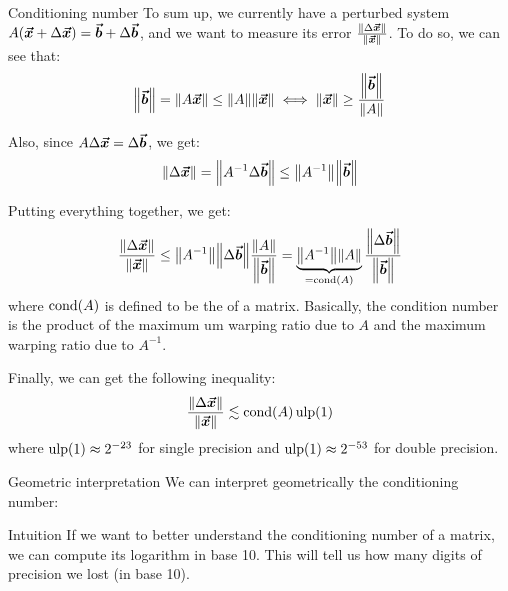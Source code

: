 \documentclass[a4paper]{article}
\begin{document}
\begin{parag}{Conditioning number}
    To sum up, we currently have a perturbed system $A\left(\bvec{x} + \Delta \bvec{x}\right) = \bvec{b} + \Delta \bvec{b}$, and we want to measure its error $\frac{\left\|\Delta \bvec{x}\right\|}{\left\|\bvec{x}\right\|}$. To do so, we can see that: 
    \[\left\|\bvec{b}\right\| = \left\|A \bvec{x}\right\| \leq \left\|A\right\| \left\|\bvec{x}\right\| \iff \left\|\bvec{x}\right\| \geq \frac{\left\|\bvec{b}\right\|}{\left\|A\right\|}\]
    
    Also, since $A \Delta \bm{\protect\vec{x}} = \Delta \bm{\protect\vec{b}}$, we get: 
    \[\left\|\Delta \bvec{x}\right\| = \left\|A ^{-1} \Delta \bvec{b}\right\| \leq \left\|A^{-1}\right\| \left\|\bvec{b}\right\|\]
    
    Putting everything together, we get: 
    \[\frac{\left\|\Delta \bvec{x}\right\|}{\left\|\bvec{x}\right\|} \leq \left\|A^{-1}\right\|\left\|\Delta \bvec{b}\right\| \frac{\left\|A\right\|}{\left\|\bvec{b}\right\|} = \underbrace{\left\|A^{-1}\right\| \left\|A\right\|}_{= \cond\left(A\right)} \frac{\left\|\Delta \bvec{b}\right\|}{\left\|\bvec{b}\right\|}\]
    where $\cond\left(A\right)$ is defined to be the  of a matrix. Basically, the condition number is the product of the maximum um warping ratio due to $A$ and the maximum warping ratio due to $A^{-1}$.
        
    Finally, we can get the following inequality: 
    \[\frac{\left\|\Delta\bvec{x}\right\|}{\left\| \bvec{x}\right\|} \lesssim \cond\left(A\right) \ulp\left(1\right)\]
    where $\ulp\left(1\right) \approx 2^{-23}$ for single precision and $\ulp\left(1\right) \approx 2^{-53}$ for double precision.

    \begin{subparag}{Geometric interpretation}
        We can interpret geometrically the conditioning number:
    \end{subparag}

    \begin{subparag}{Intuition}
        If we want to better understand the conditioning number of a matrix, we can compute its logarithm in base 10. This will tell us how many digits of precision we lost (in base 10).
    \end{subparag}


\end{parag}
\end{document}
